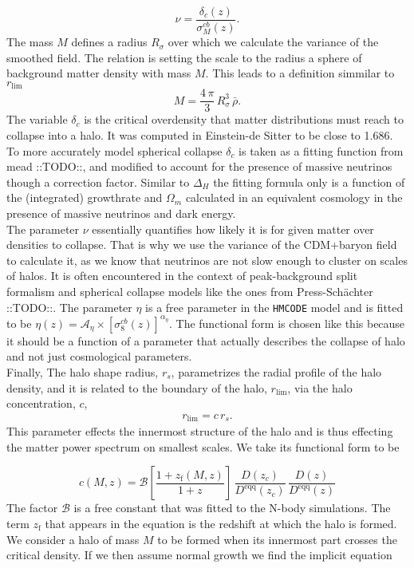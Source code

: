 \documentclass[oneside]{book}
\newcommand*{\marktodo}{{\color{mmcol} ::TODO::}\xspace}
\newcommand*{\hmcode}{\texttt{HMCODE}\xspace}
\begin{document}
\begin{equation}
\nu = \frac{\delta_c(z)}{\sigma^{cb}_M(z)}.
\end{equation}
The mass $M$ defines a radius $R_\sigma$ over which we calculate the variance of the smoothed field. The relation is setting the scale to the radius a sphere of background matter density with mass $M$. This leads to a definition simmilar to $r_\mathrm{lim}$ \begin{equation*}
    M =  \frac{4\,\pi}{3}\,R_\sigma^3\,\bar{\rho}.
\end{equation*}
The variable $\delta_c$ is the critical overdensity that matter distributions must reach to collapse into a halo. It was computed in Einstein-de Sitter to be close to 1.686. To more accurately model spherical collapse $\delta_c$ is taken as a fitting function from mead\marktodo, and modified to account for the presence of massive neutrinos though a correction factor. Similar to $\Delta_H$ the fitting formula only is a function of the (integrated) growthrate and $\Omega_m$ calculated in an equivalent cosmology in the presence of massive neutrinos and dark energy.\\
The parameter $\nu$ essentially quantifies how likely it is for given matter over densities to collapse. That is why we use the variance of the CDM+baryon field to calculate it, as we know that neutrinos are not slow enough to cluster on scales of halos. It is often encountered in the context of peak-background split formalism and spherical collapse models like the ones from Press-Schächter \marktodo. The parameter $\eta$ is a free parameter in the \hmcode model and is fitted to be $\eta(z)=\mathcal{A}_\eta\times\left[\sigma_8^{cb}(z)\right]^{\alpha_\eta}$. The functional form is chosen like this because it should be a function of a parameter that actually describes the collapse of halo and not just cosmological parameters.\\
Finally, The halo shape radius, $r_s$, parametrizes the radial profile of the halo density, and it is related to the boundary of the halo, $r_\mathrm{lim}$, via the halo concentration, $c$, \begin{align*}
    r_\mathrm{lim} = c\,r_s.
\end{align*}
This parameter effects the innermost structure of the halo and is thus effecting the matter power spectrum on smallest scales. We take its functional form to be

\begin{equation}
    c(M,z) = \mathcal{B}\left[\frac{1+z_\mathrm{f}(M,z)}{1+z}\right]\,\frac{D(z_c)}{D^\mathrm{eqq}(z_c)}\,\frac{D(z)}{D^\mathrm{eqq}(z)}
\end{equation}
The factor $\mathcal{B}$ is a free constant that was fitted to the N-body simulations. The term $z_\mathrm{f}$ that appears in the equation is the redshift at which the halo is formed. We consider a halo of mass $M$ to be formed when its innermost part crosses the critical density. If we then assume normal growth we find the implicit equation
\end{document}

